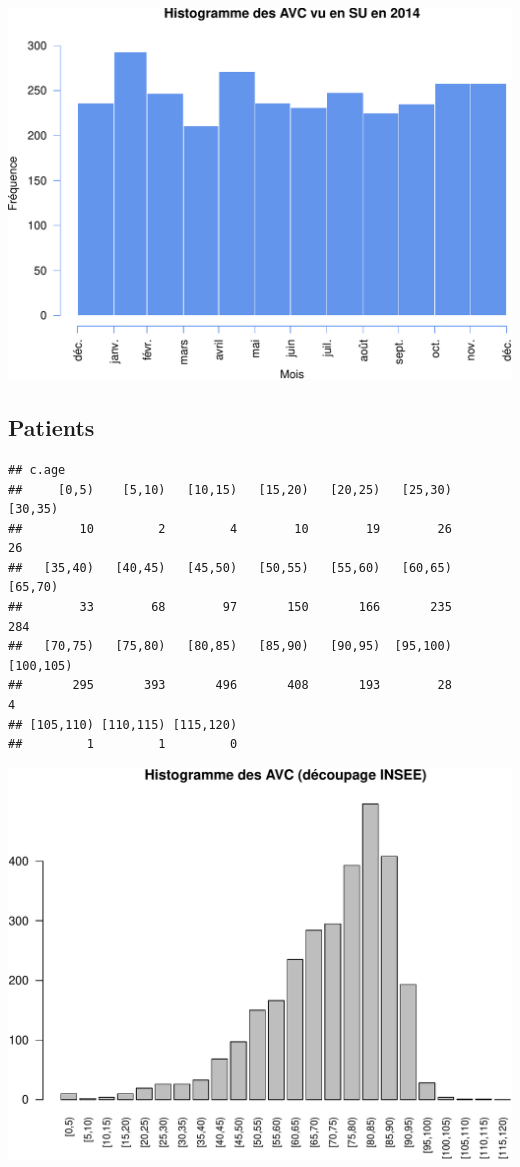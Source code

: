 \documentclass[]{article}
\begin{document}
\includegraphics{rapport2014_V4_files/figure-latex/hist_avc-1.pdf}

\subsection{Patients}\label{patients-3}

\begin{verbatim}
## c.age
##     [0,5)    [5,10)   [10,15)   [15,20)   [20,25)   [25,30)   [30,35) 
##        10         2         4        10        19        26        26 
##   [35,40)   [40,45)   [45,50)   [50,55)   [55,60)   [60,65)   [65,70) 
##        33        68        97       150       166       235       284 
##   [70,75)   [75,80)   [80,85)   [85,90)   [90,95)  [95,100) [100,105) 
##       295       393       496       408       193        28         4 
## [105,110) [110,115) [115,120) 
##         1         1         0
\end{verbatim}

\includegraphics{rapport2014_V4_files/figure-latex/Patients-1.pdf}
\end{document}
